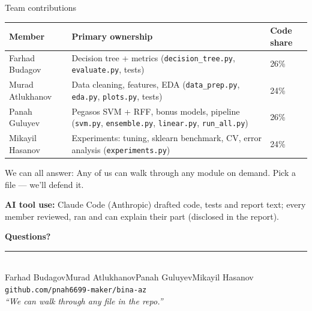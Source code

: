 \documentclass[aspectratio=169,11pt]{beamer}
\newcommand{\memberone}{Farhad Budagov}
\newcommand{\membertwo}{Murad Atlukhanov}
\newcommand{\memberthree}{Panah Guluyev}
\newcommand{\memberfour}{Mikayil Hasanov}
\newcommand{\repolink}{github.com/pnah6699-maker/bina-az}
\begin{document}
\begin{frame}{Team contributions}
  \begin{center}\small
  \begin{tabularx}{\linewidth}{l>{\raggedright\arraybackslash}Xl}
    \toprule
    \textbf{Member} & \textbf{Primary ownership} & \textbf{Code share} \\
    \midrule
    \memberone   & Decision tree + metrics (\texttt{decision\_tree.py}, \texttt{evaluate.py}, tests) & 26\% \\
    \membertwo   & Data cleaning, features, EDA (\texttt{data\_prep.py}, \texttt{eda.py}, \texttt{plots.py}, tests) & 24\% \\
    \memberthree & Pegasos SVM + RFF, bonus models, pipeline (\texttt{svm.py}, \texttt{ensemble.py}, \texttt{linear.py}, \texttt{run\_all.py}) & 26\% \\
    \memberfour  & Experiments: tuning, sklearn benchmark, CV, error analysis (\texttt{experiments.py}) & 24\% \\
    \bottomrule
  \end{tabularx}
  \end{center}

  \vspace{0.3em}
  \begin{block}{We can all answer:}
    Any of us can walk through any module on demand. Pick a file --- we'll defend it.
  \end{block}

  \vspace{0.2em}
  \textbf{AI tool use:} Claude Code (Anthropic) drafted code, tests and report text;
  every member reviewed, ran and can explain their part (disclosed in the report).
\end{frame}

{%
\begin{frame}[plain]
  \begin{center}
    \vspace{1cm}
    {\Huge\bfseries\color{accent} Questions?}\\[1.2em]
    \rule{0.5\textwidth}{0.6pt}\\[1.2em]
    {\normalsize \memberone\quad\textbullet\quad\membertwo\quad\textbullet\quad\memberthree\quad\textbullet\quad\memberfour}\\[0.6em]
    {\normalsize \texttt{\repolink}}\\[1cm]
    {\footnotesize\itshape ``We can walk through any file in the repo.''}
  \end{center}
\end{frame}
}
\end{document}
